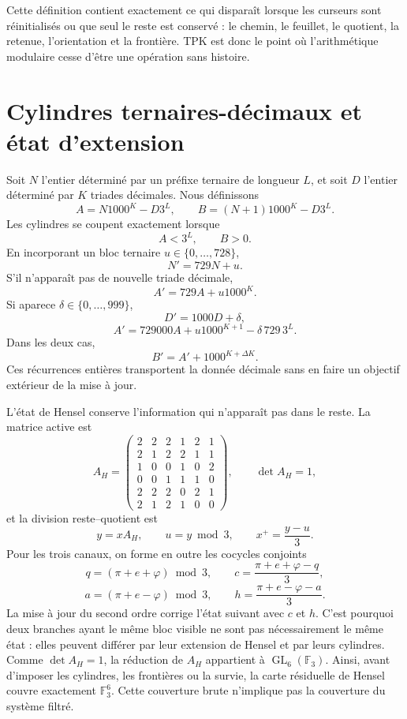 Cette définition contient exactement ce qui disparaît lorsque les curseurs sont réinitialisés
ou que seul le reste est conservé : le chemin, le feuillet, le quotient, la
retenue, l'orientation et la frontière. TPK est donc le point où
l'arithmétique modulaire cesse d'être une opération sans histoire.

\section{Cylindres ternaires-décimaux et état d'extension}

Soit \(N\) l'entier déterminé par un préfixe ternaire de longueur \(L\), et
soit \(D\) l'entier déterminé par \(K\) triades décimales. Nous définissons
\[
 A=N1000^K-D3^L,
 \qquad
 B=(N+1)1000^K-D3^L.
\]
Les cylindres se coupent exactement lorsque
\[
 \boxed{A<3^L,\qquad B>0.}
\]
En incorporant un bloc ternaire \(u\in\{0,\ldots,728\}\),
\[
 N'=729N+u.
\]
S'il n'apparaît pas de nouvelle triade décimale,
\[
 A'=729A+u1000^K.
\]
Si aparece \(\delta\in\{0,\ldots,999\}\),
\[
 D'=1000D+\delta,
\]
\[
 A'=729000A+u1000^{K+1}-\delta\,729\,3^L.
\]
Dans les deux cas,
\[
 B'=A'+1000^{K+\Delta K}.
\]
Ces récurrences entières transportent la donnée décimale sans en faire un
objectif extérieur de la mise à jour.

L'état de Hensel conserve l'information qui n'apparaît pas dans le reste. La
matrice active est
\[
A_H=\begin{pmatrix}
2&2&2&1&2&1\\2&1&2&2&1&1\\1&0&0&1&0&2\\
0&0&1&1&1&0\\2&2&2&0&2&1\\2&1&2&1&0&0
\end{pmatrix},\qquad \det A_H=1,
\]
et la division reste--quotient est
\[
 y=xA_H,\qquad u=y\bmod3,\qquad x^+=\frac{y-u}{3}.
\]
Pour les trois canaux, on forme en outre les cocycles conjoints
\[
 q=(\pi+e+\varphi)\bmod3,
 \qquad
 c=\frac{\pi+e+\varphi-q}{3},
\]
\[
 a=(\pi+e-\varphi)\bmod3,
 \qquad
 h=\frac{\pi+e-\varphi-a}{3}.
\]
La mise à jour du second ordre corrige l'état suivant avec \(c\) et
\(h\). C'est pourquoi deux branches ayant le même bloc visible ne sont pas nécessairement le
même état : elles peuvent différer par leur extension de Hensel et par leurs cylindres.
Comme \(\det A_H=1\), la réduction de \(A_H\) appartient à
\(\operatorname{GL}_6(\mathbb F_3)\). Ainsi, avant d'imposer les cylindres,
les frontières ou la survie, la carte résiduelle de Hensel couvre exactement
\(\mathbb F_3^6\). Cette couverture brute n'implique pas la couverture du système
filtré.

